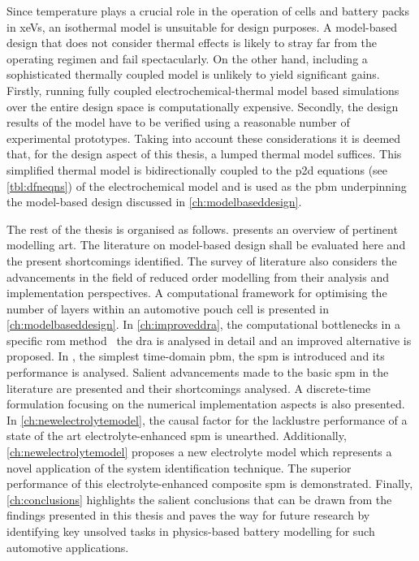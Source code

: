 
Since temperature  plays a crucial  role in the  operation of cells  and battery
packs in \glspl{xeV},  an isothermal model is unsuitable for  design purposes. A
model-based design that does not consider thermal effects is likely to stray far
from the operating regimen and fail  spectacularly. On the other hand, including
a sophisticated thermally coupled model  is unlikely to yield significant gains.
Firstly, running  fully coupled electrochemical-thermal model  based simulations
over the entire design space  is computationally expensive. Secondly, the design
results  of the  model have  to  be verified using  a reasonable  number of
experimental prototypes.  Taking  into account  these  considerations it  is
deemed  that, for  the design  aspect  of this  thesis, a  lumped thermal  model
suffices.  This  simplified thermal  model  is  bidirectionally coupled  to  the
\gls{p2d} equations  (see \cref{tbl:dfneqns})  of the electrochemical  model and
is  used as  the  \gls{pbm}  underpinning the  model-based  design discussed  in
\cref{ch:modelbaseddesign}.

The rest of the thesis is organised as follows.  presents an
overview of pertinent modelling art.  The literature on model-based design shall
be  evaluated  here and  the  present  shortcomings  identified. The  survey  of
literature  also  considers the  advancements  in  the  field of  reduced  order
modelling from  their analysis and implementation  perspectives. A computational
framework  for  optimising the  number  of  layers  within an  automotive  pouch
cell  is  presented  in  \cref{ch:modelbaseddesign}.  In  \cref{ch:improveddra},
the  computational   bottlenecks  in   a  specific  \gls{rom}   method  \viz~the
\gls{dra} is  analysed in  detail and  an improved  alternative is  proposed. In
,  the simplest  time-domain  \gls{pbm},  the \gls{spm}  is
introduced  and  its  performance  is analysed.  Salient  advancements  made  to
the  basic \gls{spm}  in the  literature  are presented  and their  shortcomings
analysed. A  discrete-time formulation focusing on  the numerical implementation
aspects is  also presented. In \cref{ch:newelectrolytemodel},  the causal factor
for  the lacklustre  performance  of  a state  of  the art  electrolyte-enhanced
\gls{spm} is  unearthed. Additionally, \cref{ch:newelectrolytemodel}  proposes a
new  electrolyte  model which  represents  a  novel  application of  the  system
identification technique. The superior  performance of this electrolyte-enhanced
composite \gls{spm}  is demonstrated. Finally,  \cref{ch:conclusions} highlights
the salient  conclusions that can be  drawn from the findings  presented in this
thesis and paves  the way for future research by  identifying key unsolved tasks
in physics-based battery modelling for such automotive applications.

